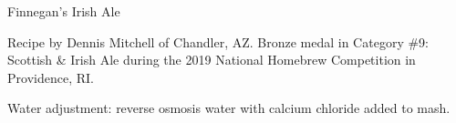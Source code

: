 \stylesection{\styleirishredale}

\begin{recipe}{Finnegan's Irish Ale}

\begin{aboutblock}
Recipe by Dennis Mitchell of Chandler, AZ. Bronze medal in Category \#9: Scottish
\& Irish Ale during the 2019 National Homebrew Competition in Providence, RI.
\sourceaha
\end{aboutblock}


\begin{methodandtiming}
 
\begin{mashsteps}
\end{mashsteps}

\begin{fermentationsteps}
\end{fermentationsteps}

\begin{directions}
Water adjustment: reverse osmosis water with  calcium chloride added to
mash.
\end{directions}

\end{methodandtiming}

\recipebreak

\begin{ingredientsblock}

\begin{malts}
\end{malts}

\begin{hops}
\end{hops}


\end{ingredientsblock}

\end{recipe}

